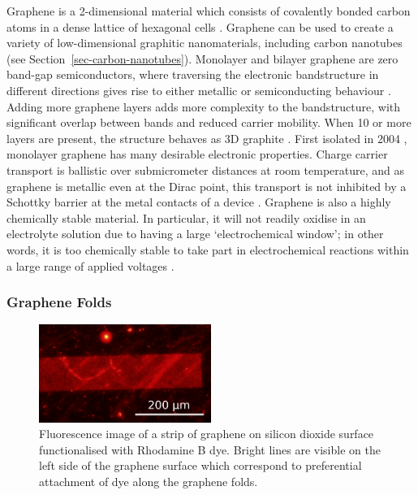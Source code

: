 \documentclass[
  a4paper,
]{scrbook}
\begin{document}
Graphene is a 2-dimensional material which consists of covalently bonded
carbon atoms in a dense lattice of hexagonal cells
\autocite{McEuen2002,Novoselov2004,Geim2007,Tran2016}. Graphene can be
used to create a variety of low-dimensional graphitic nanomaterials,
including carbon nanotubes \autocite{McEuen2002} (see
Section~\ref{sec-carbon-nanotubes}). Monolayer and bilayer graphene are
zero band-gap semiconductors, where traversing the electronic
bandstructure in different directions gives rise to either metallic or
semiconducting behaviour \autocite{McEuen2002}. Adding more graphene
layers adds more complexity to the bandstructure, with significant
overlap between bands and reduced carrier mobility. When 10 or more
layers are present, the structure behaves as 3D graphite
\autocite{Geim2007,Ohno2015}. First isolated in 2004
\autocite{Novoselov2004}, monolayer graphene has many desirable
electronic properties. Charge carrier transport is ballistic over
submicrometer distances at room temperature, and as graphene is metallic
even at the Dirac point, this transport is not inhibited by a Schottky
barrier at the metal contacts of a device
\autocite{Novoselov2004,Geim2007}. Graphene is also a highly chemically
stable material. In particular, it will not readily oxidise in an
electrolyte solution due to having a large `electrochemical window'; in
other words, it is too chemically stable to take part in electrochemical
reactions within a large range of applied voltages
\autocite{Ohno2015,Tran2016}.

\hypertarget{graphene-folds}{%
\subsubsection*{Graphene Folds}\label{graphene-folds}}

\begin{figure}

{\centering \includegraphics[width=0.5\textwidth,height=\textheight]{figures/ch2/modified_NGW8D4_1mM_rhodamineB_centralchannel3_postMsurfactantclean5min_2.4sexposure_20X_221111.png}

}

\caption{\label{fig-graphene-folds}Fluorescence image of a strip of
graphene on silicon dioxide surface functionalised with Rhodamine B dye.
Bright lines are visible on the left side of the graphene surface which
correspond to preferential attachment of dye along the graphene folds.}

\end{figure}
\end{document}
